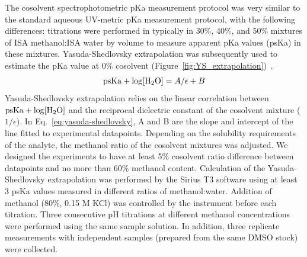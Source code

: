 \documentclass[9pt,lineno]{elife}
\begin{document}
The cosolvent spectrophotometric pKa measurement protocol was very similar to the standard aqueous UV-metric pKa measurement protocol, with the following differences: 
titrations were performed in typically in 30\%, 40\%, and 50\% mixtures of ISA methanol:ISA water by volume to measure apparent pKa values (psKa) in these mixtures. 
Yasuda-Shedlovsky extrapolation was subsequently used to estimate the pKa value at 0\% cosolvent (Figure~\ref{fig:YS_extrapolation})~\citep{avdeef_ph-metric_1999,doi:10.1021/ac00049a010,TAKACSNOVAK1997235}. 
\begin{equation}
\mathrm{psKa} + \log [\ce{H2O}]=A/\epsilon+B 
\label{eq:yasuda-shedlovsky}
\end{equation}
Yasuda-Shedlovsky extrapolation relies on the linear correlation between $\mathrm{psKa} + \log [\ce{H2O}]$ and the reciprocal dielectric constant of the cosolvent mixture ($1/\epsilon$). 
In Eq.~\ref{eq:yasuda-shedlovsky}, A and B are the slope and intercept of the line fitted to experimental datapoints.  
Depending on the solubility requirements of the analyte, the methanol ratio of the cosolvent mixtures was adjusted. 
We designed the experiments to have at least 5\% cosolvent ratio difference between datapoints and no more than 60\% methanol content. 
Calculation of the Yasuda-Shedlovsky extrapolation was performed by the Sirius T3 software using at least 3 psKa values measured in different ratios of methanol:water.
Addition of methanol (80\%, 0.15 M KCl) was controlled by the instrument before each titration. 
Three consecutive pH titrations at different methanol concentrations were performed using the same sample solution. 
In addition, three replicate measurements with independent samples (prepared from the same DMSO stock) were collected.
\end{document}

